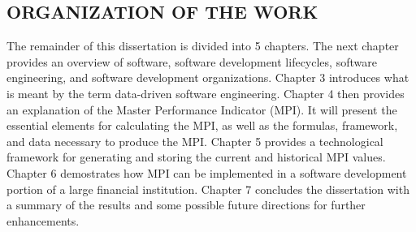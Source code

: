 \documentclass[SDSUThesis.tex]{subfiles}
\begin{document}
\subsection{ORGANIZATION OF THE WORK}

The remainder of this dissertation is divided into 5 chapters.  The next chapter provides
an overview of software, software development lifecycles, software engineering, and software
development organizations.  Chapter 3 introduces what is meant by the term data-driven
software engineering. Chapter 4 then provides an explanation of the Master Performance 
Indicator (MPI).  It will present the essential elements for calculating the MPI, as well
as the formulas, framework, and data necessary to produce the MPI. Chapter 5 provides
a technological framework for generating and storing the current and historical MPI values.
Chapter 6 demostrates how MPI can be implemented in a software development portion of 
a large financial institution.  Chapter 7 concludes the dissertation with a summary
of the results and some possible future directions for further enhancements. 
\end{document}
